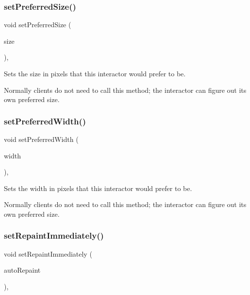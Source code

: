 \subsubsection{\texorpdfstring{set\+Preferred\+Size()}{setPreferredSize()}\hspace{0.1cm}{\footnotesize\ttfamily [2/2]}}
{\footnotesize\ttfamily void set\+Preferred\+Size (\begin{DoxyParamCaption}\item[{const \mbox{\hyperlink{structGDimension}{G\+Dimension}} \&}]{size }\end{DoxyParamCaption})\hspace{0.3cm}{\ttfamily [virtual]}, {\ttfamily [inherited]}}



Sets the size in pixels that this interactor would prefer to be. 

Normally clients do not need to call this method; the interactor can figure out its own preferred size. \mbox{\label{classGInteractor_a3db429ab2fa52efd187eec0ed8cdd9f2}} 
\subsubsection{\texorpdfstring{set\+Preferred\+Width()}{setPreferredWidth()}}
{\footnotesize\ttfamily void set\+Preferred\+Width (\begin{DoxyParamCaption}\item[{double}]{width }\end{DoxyParamCaption})\hspace{0.3cm}{\ttfamily [virtual]}, {\ttfamily [inherited]}}



Sets the width in pixels that this interactor would prefer to be. 

Normally clients do not need to call this method; the interactor can figure out its own preferred size. \mbox{\label{classGDrawingSurface_abf5590a3992dcb7896ed449e65961da3}} 
\subsubsection{\texorpdfstring{set\+Repaint\+Immediately()}{setRepaintImmediately()}}
{\footnotesize\ttfamily void set\+Repaint\+Immediately (\begin{DoxyParamCaption}\item[{bool}]{auto\+Repaint }\end{DoxyParamCaption})\hspace{0.3cm}{\ttfamily [virtual]}, {\ttfamily [inherited]}}



